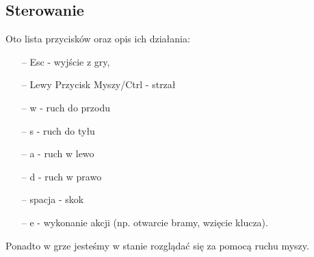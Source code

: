 \documentclass[12pt,a4paper]{article}
\newcommand{\si}{ś}
\begin{document}
	\subsection*{Sterowanie}
	Oto lista przycisków oraz opis ich działania: 
	\begin{itemize}
		\item[--] Esc - wyj\si cie z gry,
		\item[--]  Lewy Przycisk Myszy/Ctrl - strzał
		\item[--]  w - ruch do przodu
		\item[--]  s - ruch do tyłu
		\item[--]  a - ruch w lewo
		\item[--]  d - ruch w prawo
		\item[--] spacja - skok
		\item[--]  e - wykonanie akcji (np. otwarcie bramy, wzięcie klucza).
	\end{itemize}
	Ponadto w grze jeste\si my w stanie rozglądać się za pomocą ruchu myszy.
\end{document}
